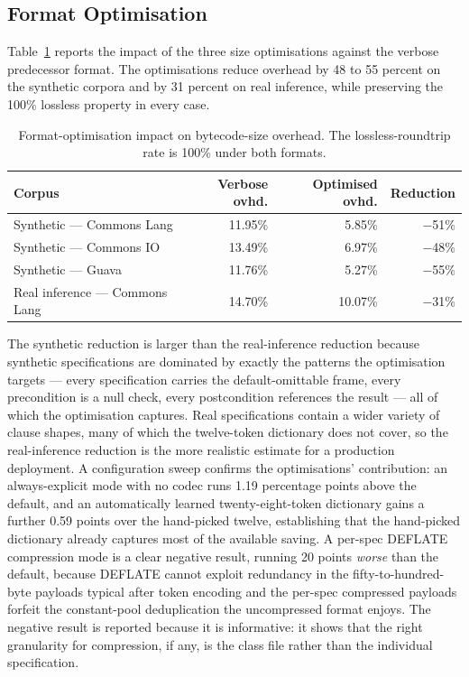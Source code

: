 \subsection{Format Optimisation}

Table~\ref{tab:dist-opt} reports the impact of the three size optimisations
against the verbose predecessor format. The optimisations reduce overhead by 48
to 55 percent on the synthetic corpora and by 31 percent on real inference,
while preserving the 100\% lossless property in every case.

\begin{table}[ht]
\centering
\caption{Format-optimisation impact on bytecode-size overhead. The
lossless-roundtrip rate is 100\% under both formats.}
\label{tab:dist-opt}
\begin{tabular}{lrrr}
\toprule
\textbf{Corpus} & \textbf{Verbose ovhd.} & \textbf{Optimised ovhd.} & \textbf{Reduction} \\
\midrule
Synthetic --- Commons Lang      & 11.95\% & 5.85\%  & $-$51\% \\
Synthetic --- Commons IO        & 13.49\% & 6.97\%  & $-$48\% \\
Synthetic --- Guava             & 11.76\% & 5.27\%  & $-$55\% \\
Real inference --- Commons Lang & 14.70\% & 10.07\% & $-$31\% \\
\bottomrule
\end{tabular}
\end{table}

The synthetic reduction is larger than the real-inference reduction because
synthetic specifications are dominated by exactly the patterns the optimisation
targets --- every specification carries the default-omittable frame, every
precondition is a null check, every postcondition references the result --- all
of which the optimisation captures. Real specifications contain a wider variety
of clause shapes, many of which the twelve-token dictionary does not cover, so
the real-inference reduction is the more realistic estimate for a production
deployment. A configuration sweep confirms the optimisations' contribution: an
always-explicit mode with no codec runs 1.19 percentage points above the
default, and an automatically learned twenty-eight-token dictionary gains a
further 0.59 points over the hand-picked twelve, establishing that the
hand-picked dictionary already captures most of the available saving. A per-spec
DEFLATE compression mode is a clear negative result, running 20 points
\emph{worse} than the default, because DEFLATE cannot exploit redundancy in the
fifty-to-hundred-byte payloads typical after token encoding and the per-spec
compressed payloads forfeit the constant-pool deduplication the uncompressed
format enjoys. The negative result is reported because it is informative: it
shows that the right granularity for compression, if any, is the class file
rather than the individual specification.

